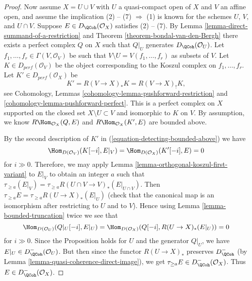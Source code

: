 \begin{proof}
\medskip\noindent
Now assume $X = U \cup V$ with $U$ a quasi-compact open of $X$ and
$V$ an affine open, and assume the implication (2) -- (7) $\Rightarrow$ (1)
is known for the schemes $U$, $V$, and $U \cap V$.
Suppose $E \in D_\QCoh(\mathcal{O}_X)$ satisfies (2) -- (7).
By Lemma \ref{lemma-direct-summand-of-a-restriction} and
Theorem \ref{theorem-bondal-van-den-Bergh} there exists a perfect
complex $Q$ on $X$ such that $Q|_U$ generates $D_\QCoh (\mathcal{O}_U)$. 
Let $f_1, \dots , f_r \in \Gamma (V, \mathcal{O}_V)$
be such that $V \setminus U = V(f_1, \dots , f_r)$ as subsets of
$V$. Let $K \in D_{perf}(\mathcal{O}_V)$ be the object
corresponding to the Koszul complex on $f_1, \dots , f_r$.
Let $K' \in D_{perf}(\mathcal{O}_X)$ be
\begin{equation}
\label{equation-detecting-bounded-above}
K' = R (V \to X)_* K = R (V \to X)_! K,
\end{equation}
see Cohomology, Lemmas \ref{cohomology-lemma-pushforward-restriction} and
\ref{cohomology-lemma-pushforward-perfect}. This is a perfect
complex on $X$ supported on the closed set $X \setminus U \subset V$
and isomorphic to $K$ on $V$. By assumption, we know
$R\Hom_{\mathcal{O}_X}(Q, E)$ and
$R\Hom_{\mathcal{O}_X}(K', E)$ are bounded above.

\medskip\noindent
By the second description of $K'$ in (\ref{equation-detecting-bounded-above})
we have
$$
\Hom_{D(\mathcal{O}_V)}(K[-i], E|_V) = \Hom_{D(\mathcal{O}_X)}(K'[-i], E) = 0
$$
for $i \gg 0$. Therefore, we may apply
Lemma \ref{lemma-orthogonal-koszul-first-variant} to $E|_V$ to
obtain an integer $a$ such that
$\tau_{\geq a}(E|_V) = \tau_{\geq a} R (U \cap V \to V)_* (E|_{U \cap V})$.
Then $\tau_{\geq a} E = \tau_{\geq a} R (U \to X)_* (E |_U)$
(check that the canonical map is an isomorphism after restricting to
$U$ and to $V$). Hence using Lemma \ref{lemma-bounded-truncation}
twice we see that
$$
\Hom_{D(\mathcal{O}_U)}(Q|_U [-i], E|_U) =
\Hom_{D(\mathcal{O}_X)}(Q[-i], R (U \to X)_* (E|_U)) = 0
$$
for $i \gg 0$. Since the Proposition holds for $U$ and the generator
$Q|_U$, we have $E|_U \in D^-_\QCoh(\mathcal{O}_U)$. But then since
the functor $R (U \to X)_*$ preserves $D^-_\QCoh$ 
(by Lemma \ref{lemma-quasi-coherence-direct-image}), we get
$\tau_{\geq a}E \in D^-_\QCoh(\mathcal{O}_X)$. Thus 
$E \in D^-_\QCoh (\mathcal{O}_X)$. 
\end{proof}


